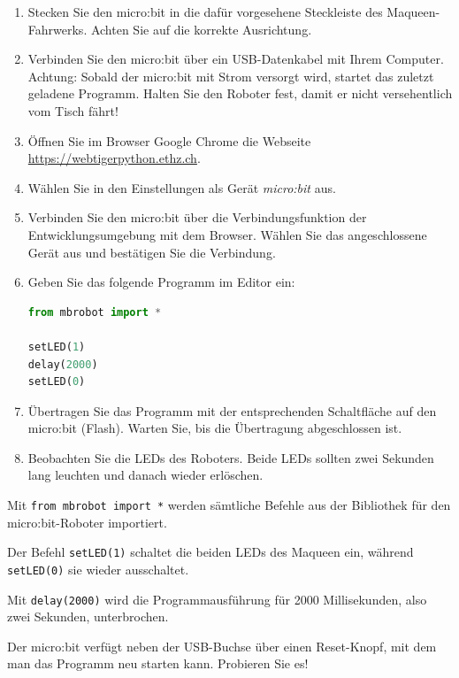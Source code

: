 \begin{enumerate}
    \item Stecken Sie den micro:bit in die dafür vorgesehene
          Steckleiste des Maqueen-Fahrwerks. Achten Sie
          auf die korrekte Ausrichtung.

    \item Verbinden Sie den micro:bit über ein USB-Datenkabel
          mit Ihrem Computer. Achtung: Sobald der micro:bit mit Strom versorgt wird, startet das zuletzt geladene Programm. Halten Sie den Roboter fest, damit er nicht versehentlich vom Tisch fährt!

    \item Öffnen Sie im Browser Google Chrome die Webseite
          \url{https://webtigerpython.ethz.ch}.

    \item Wählen Sie in den Einstellungen als Gerät
          \emph{micro:bit} aus.

    \item Verbinden Sie den micro:bit über die
          Verbindungsfunktion der Entwicklungsumgebung
          mit dem Browser. Wählen Sie das angeschlossene
          Gerät aus und bestätigen Sie die Verbindung.

    \item Geben Sie das folgende Programm im Editor ein:

          \begin{lstlisting}[language=Python]
from mbrobot import *

setLED(1)
delay(2000)
setLED(0)
\end{lstlisting}

    \item Übertragen Sie das Programm mit der entsprechenden
          Schaltfläche auf den micro:bit (Flash).
          Warten Sie, bis die Übertragung abgeschlossen ist.

    \item Beobachten Sie die LEDs des Roboters.
          Beide LEDs sollten zwei Sekunden lang leuchten
          und danach wieder erlöschen.
\end{enumerate}

\begin{myremark}
    Mit \texttt{from mbrobot import *} werden sämtliche Befehle aus der Bibliothek für den micro:bit-Roboter importiert.

    Der Befehl \texttt{setLED(1)} schaltet die beiden
    LEDs des Maqueen ein, während \texttt{setLED(0)}
    sie wieder ausschaltet.

    Mit \texttt{delay(2000)} wird die Programmausführung
    für 2000 Millisekunden, also zwei Sekunden, unterbrochen.

    Der micro:bit verfügt neben der USB-Buchse über einen Reset-Knopf, mit dem man das Programm neu starten kann. Probieren Sie es!
\end{myremark}


